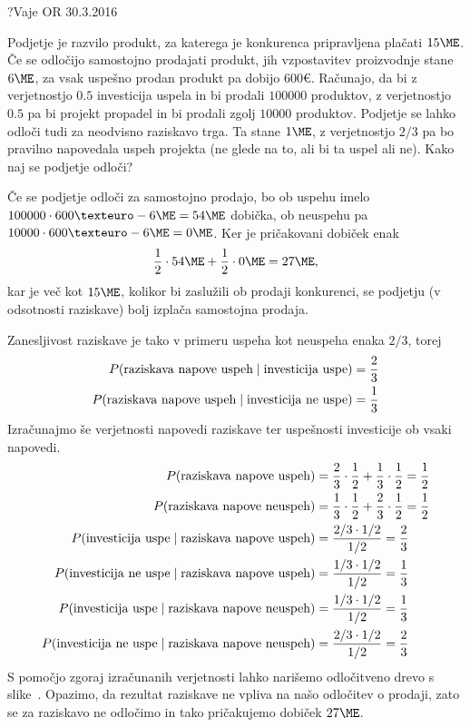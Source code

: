 \begin{naloga}{?}{Vaje OR 30.3.2016}
\begin{vprasanje}
Podjetje je razvilo produkt,
za katerega je konkurenca pripravljena plačati $15 \ME$.
Če se odločijo samostojno prodajati produkt,
jih vzpostavitev proizvodnje stane $6 \ME$,
za vsak uspešno prodan produkt pa dobijo $600 €$.
Računajo, da bi z ve\-rjet\-nost\-jo $0.5$ investicija uspela
in bi prodali $100000$ produktov,
z verjetnostjo $0.5$ pa bi projekt propadel
in bi prodali zgolj $10000$ produktov.
Podjetje se lahko odloči tudi za neodvisno raziskavo trga.
Ta stane $1 \ME$,
z verjetnostjo $2/3$ pa bo pravilno napovedala uspeh projekta
(ne glede na to, ali bi ta uspel ali ne).
Kako naj se podjetje odloči?
\end{vprasanje}

\begin{odgovor}
Če se podjetje odloči za samostojno prodajo,
bo ob uspehu imelo $100000 \cdot 600 € - 6 \ME = 54 \ME$ dobička,
ob neuspehu pa $10000 \cdot 600 € - 6 \ME = 0 \ME$.
Ker je pričakovani dobiček enak
$$
{1 \over 2} \cdot 54 \ME + {1 \over 2} \cdot 0 \ME = 27 \ME,
$$
kar je več kot $15 \ME$,
kolikor bi zaslužili ob prodaji konkurenci,
se podjetju (v odsotnosti raziskave) bolj izplača samostojna prodaja.

Zanesljivost raziskave je tako v primeru uspeha kot neuspeha enaka $2/3$,
torej
\begin{align*}
P(\text{raziskava napove uspeh} \;|\; \text{investicija uspe})
&= {2 \over 3} \\
P(\text{raziskava napove uspeh} \;|\; \text{investicija ne uspe})
&= {1 \over 3}
\end{align*}
Izračunajmo še verjetnosti napovedi raziskave
ter uspešnosti investicije ob vsaki napovedi.
\begin{align*}
P(\text{raziskava napove uspeh}) &=
{2 \over 3} \cdot {1 \over 2} + {1 \over 3} \cdot {1 \over 2} = {1 \over 2} \\
P(\text{raziskava napove neuspeh}) &=
{1 \over 3} \cdot {1 \over 2} + {2 \over 3} \cdot {1 \over 2} = {1 \over 2} \\
P(\text{investicija uspe} \;|\; \text{raziskava napove uspeh})
&= {2/3 \cdot 1/2 \over 1/2} = {2 \over 3} \\
P(\text{investicija ne uspe} \;|\; \text{raziskava napove uspeh})
&= {1/3 \cdot 1/2 \over 1/2} = {1 \over 3} \\
P(\text{investicija uspe} \;|\; \text{raziskava napove neuspeh})
&= {1/3 \cdot 1/2 \over 1/2} = {1 \over 3} \\
P(\text{investicija ne uspe} \;|\; \text{raziskava napove neuspeh})
&= {2/3 \cdot 1/2 \over 1/2} = {2 \over 3}
\end{align*}
S pomočjo zgoraj izračunanih verjetnosti
lahko narišemo odločitveno drevo s slike~\fig.
Opazimo, da rezultat raziskave ne vpliva na našo odločitev o prodaji,
zato se za raziskavo ne odločimo
in tako pričakujemo dobiček $27 \ME$.

\begin{slika}
\makebox[\textwidth][c]{
\pgfslika
}
\end{slika}
\end{odgovor}
\end{naloga}
